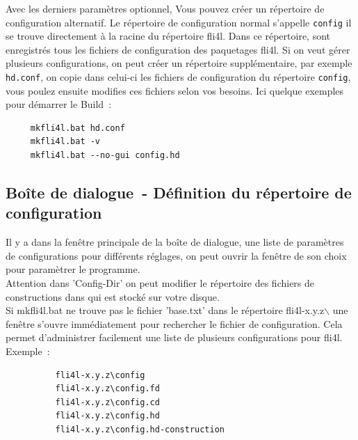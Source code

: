   Avec les derniers paramètres optionnel, Vous pouvez créer un répertoire
  de configuration alternatif. Le répertoire de configuration normal
  s'appelle \texttt{config} il se trouve directement à la racine du répertoire
  fli4l. Dans ce répertoire, sont enregistrés tous les fichiers de
  configuration des paquetages fli4l. Si on veut gérer plusieurs configurations,
  on peut créer un répertoire supplémentaire, par exemple \texttt{hd.conf},
  on copie dans celui-ci les fichiers de configuration du répertoire \texttt{config},
  vous poulez ensuite modifies ces fichiers selon vos besoins.
  Ici quelque exemples pour démarrer le Build~:
  \begin{verbatim}
     mkfli4l.bat hd.conf
     mkfli4l.bat -v
     mkfli4l.bat --no-gui config.hd
  \end{verbatim}

  \subsection{Boîte de dialogue~- Définition du répertoire de configuration}

  Il y a dans la fenêtre principale de la boîte de dialogue, une liste de
  paramètres de configurations pour différents réglages, on peut ouvrir la
  fenêtre de son choix pour paramètrer le programme.\\

  Attention dans 'Config-Dir' on peut modifier le répertoire des
  fichiers de constructions dans 
  qui est stocké sur votre disque.\\

  Si mkfli4l.bat ne trouve pas le fichier 'base.txt' dans le
  répertoire fli4l-x.y.z$\backslash$ une fenêtre s'ouvre
  immédiatement pour rechercher le fichier de configuration.
  Cela permet d'administrer facilement une liste de plusieurs
  configurations pour fli4l.\\

  Exemple~:

\begin{example}
\begin{verbatim}
          fli4l-x.y.z\config
          fli4l-x.y.z\config.fd
          fli4l-x.y.z\config.cd
          fli4l-x.y.z\config.hd
          fli4l-x.y.z\config.hd-construction
\end{verbatim}
\end{example}

